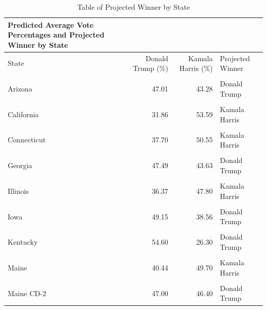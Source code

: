\documentclass[
  letterpaper,
  DIV=11,
  numbers=noendperiod]{scrartcl}
\begin{document}
\hypertarget{tbl-model-state}{}
\begin{longtable}[t]{lrrl}
\caption{\label{tbl-model-state}Table of Projected Winner by State }Predicted Average Vote Percentages and Projected Winner by State}\\
\toprule
State & Donald Trump (\%) & Kamala Harris (\%) & Projected Winner\\
\midrule
\cellcolor{gray!10}{Alaska} & \cellcolor{gray!10}{53.00} & \cellcolor{gray!10}{41.70} & \cellcolor{gray!10}{Donald Trump}\\
Arizona & 47.01 & 43.28 & Donald Trump\\
\cellcolor{gray!10}{Arkansas} & \cellcolor{gray!10}{57.30} & \cellcolor{gray!10}{29.47} & \cellcolor{gray!10}{Donald Trump}\\
California & 31.86 & 53.59 & Kamala Harris\\
\cellcolor{gray!10}{Colorado} & \cellcolor{gray!10}{38.52} & \cellcolor{gray!10}{44.44} & \cellcolor{gray!10}{Kamala Harris}\\
\addlinespace
Connecticut & 37.70 & 50.55 & Kamala Harris\\
\cellcolor{gray!10}{Florida} & \cellcolor{gray!10}{49.19} & \cellcolor{gray!10}{42.83} & \cellcolor{gray!10}{Donald Trump}\\
Georgia & 47.49 & 43.63 & Donald Trump\\
\cellcolor{gray!10}{Idaho} & \cellcolor{gray!10}{54.50} & \cellcolor{gray!10}{25.80} & \cellcolor{gray!10}{Donald Trump}\\
Illinois & 36.37 & 47.80 & Kamala Harris\\
\addlinespace
\cellcolor{gray!10}{Indiana} & \cellcolor{gray!10}{53.40} & \cellcolor{gray!10}{32.88} & \cellcolor{gray!10}{Donald Trump}\\
Iowa & 49.15 & 38.56 & Donald Trump\\
\cellcolor{gray!10}{Kansas} & \cellcolor{gray!10}{50.23} & \cellcolor{gray!10}{36.70} & \cellcolor{gray!10}{Donald Trump}\\
Kentucky & 54.60 & 26.30 & Donald Trump\\
\cellcolor{gray!10}{Louisiana} & \cellcolor{gray!10}{51.00} & \cellcolor{gray!10}{34.50} & \cellcolor{gray!10}{Donald Trump}\\
\addlinespace
Maine & 40.44 & 49.70 & Kamala Harris\\
\cellcolor{gray!10}{Maine CD-1} & \cellcolor{gray!10}{35.20} & \cellcolor{gray!10}{60.00} & \cellcolor{gray!10}{Kamala Harris}\\
Maine CD-2 & 47.00 & 46.40 & Donald Trump\\

\end{longtable}
\end{document}
